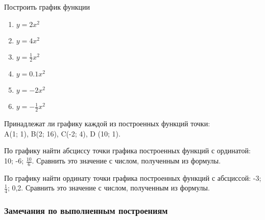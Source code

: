 \documentclass[algebra,twocolumn]{pum}
\begin{document}
  \begin{exercises}
    \begin{question}
      Построить график функции
      \begin{multicols}{3}
        \begin{enumerate}[label=\arabic*)]
        \item $y=2x^2$ 
        \item $y=4x^2$ 
        \item $y=\frac{1}{2}x^2$ 
        \item $y=0.1x^2$ 
        \item $y=-2x^2$ 
        \item $y=-\frac{1}{2}x^2$ 
      \end{enumerate}
    \end{multicols}
  \end{question}
  \begin{question}
    Принадлежат ли графику каждой из построенных функций точки:\\
    A(1; 1), B(2; 16), C(-2; 4), D (10; 1).
  \end{question}
  \begin{question}
    По графику найти абсциссу точки графика построенных функций с ординатой: 10; -6; $\frac{10}{6}$. Сравнить это значение с числом, полученным из формулы.
  \end{question}
  \begin{question}
    По графику найти ординату точки графика построенных функций с абсциссой: -3; $\frac{1}{4}$; 0,2. Сравнить это значение с числом, полученным из формулы.
  \end{question}
\end{exercises}

\subsubsection*{Замечания по выполненным построениям}
\end{document}
